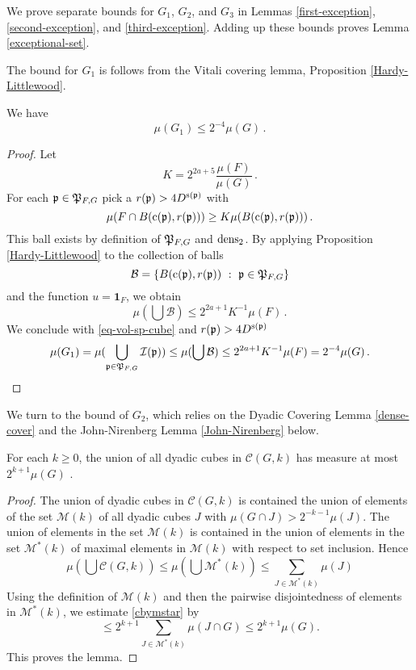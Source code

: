 {We prove separate bounds for $G_1$, $G_2$, and $G_3$
in Lemmas  \ref{first-exception},
\ref{second-exception}, and \ref{third-exception}. Adding up these bounds proves Lemma \ref{exceptional-set}.

The bound for $G_1$ is follows from the Vitali covering lemma, Proposition \ref{Hardy-Littlewood}.

\begin{lemma}
\label{first-exception}
We have
\begin{equation}
    \mu(G_1)\le 2^{-4}\mu(G)\, .
\end{equation}
\end{lemma}
\begin{proof}
Let
$$
    K = 2^{2a+5}\frac{\mu(F)}{\mu(G)}\,.
$$
For each ${\mathfrak p}\in {\mathfrak P}_{F,G}$ pick a
$r({\mathfrak p})>4D^{{\mathrm{s}}({\mathfrak p})}$  with
$$
  {\mu(F\cap B({\mathrm{c}}({\mathfrak p}),r({\mathfrak p})))}\ge K{\mu(B({\mathrm{c}}({\mathfrak p}),r({\mathfrak p})))}\, .
$$
This ball exists by definition of ${\mathfrak P}_{F,G}$
and $\operatorname{\operatorname{dens}}_2$. By applying Proposition \ref{Hardy-Littlewood} to the collection of balls
$$
    \mathcal{B} = \{B({\mathrm{c}}({\mathfrak p}),r({\mathfrak p})) \ : \ {\mathfrak p} \in {\mathfrak P}_{F,G}\}
$$
and the function $u = \mathbf{1}_F$, we obtain
$$
    \mu(\bigcup \mathcal{B}) \le 2^{2a+1} K^{-1}  \mu(F)\,.
$$
We conclude  with \eqref{eq-vol-sp-cube} and $r({\mathfrak p})>4D^{{\mathrm{s}}({\mathfrak p})}$
$$
    \mu(G_1)= \mu(\bigcup_{{\mathfrak p}\in {\mathfrak P}_{F,G}} {\mathcal{I}}({\mathfrak p}))
    \le \mu(\bigcup \mathcal{B})\le 2^{2a+1} K^{-1} \mu (F) = 2^{-4}\mu(G)\,.
$$
\end{proof}


We turn to the bound of $G_2$, which relies on the Dyadic Covering Lemma \ref{dense-cover} and the
John-Nirenberg Lemma \ref{John-Nirenberg} below.

\begin{lemma}
\label{dense-cover}

For  each $k\ge 0$, the union of all dyadic cubes
in $\mathcal{C}(G,k)$ has measure at most $2^{k+1} \mu(G)$ .
\end{lemma}
\begin{proof}
The union of dyadic cubes  in $\mathcal{C}(G,k)$
is contained the union of elements of the set $\mathcal{M}(k)$
of all dyadic cubes $J$ with
${\mu(G \cap J)} > 2^{-k-1}{\mu(J)}$.
The union of elements in the set $\mathcal{M}(k)$ is contained in the union of elements in
the set $\mathcal{M}^*(k)$ of maximal elements in
$\mathcal{M}(k)$ with respect to set inclusion. Hence
\begin{equation}\label{cbymstar}
\mu (\bigcup \mathcal{C}(G,k))\le \mu (\bigcup \mathcal{M}^*(k))\le
\sum_{J\in \mathcal{M}^*(k)}\mu(J)
\end{equation}
Using the definition of $\mathcal{M}(k)$ and then
the  pairwise disjointedness of elements in
$\mathcal{M}^*(k)$,
we estimate \eqref{cbymstar} by
\begin{equation}
\le
2^{k+1}\sum_{J\in \mathcal{M}^*(k)}\mu(J\cap G)
\le 2^{k+1}\mu(G).
\end{equation}
This proves the lemma.
\end{proof}




}
